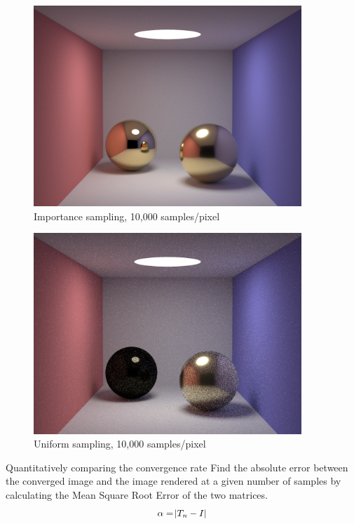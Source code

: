 \documentclass[10pt]{beamer}
\begin{document}
\begin{frame}
	\begin{figure}[H]
  \centering
    \includegraphics[width=0.9\textwidth]{convergedIS.png}
    \caption{Importance sampling, 10,000 samples/pixel}
\end{figure}
\end{frame}

\begin{frame}
	\begin{figure}[H]
  \centering
    \includegraphics[width=0.9\textwidth]{10KDS.png}
    \caption{Uniform sampling, 10,000 samples/pixel}
\end{figure}
\end{frame}

\begin{frame}{Quantitatively comparing the convergence rate}
Find the absolute error between the converged image and the image rendered at a given number of samples by calculating the Mean Square Root Error of the two matrices.   
\[ \alpha = \abs{T_n - I} \]
\end{frame}
\end{document}
